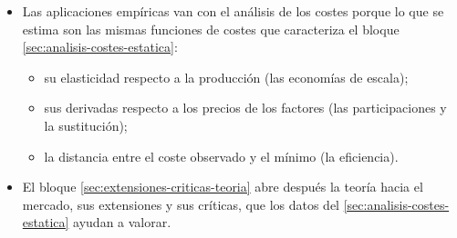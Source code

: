 \documentclass[11pt]{article}
\begin{document}
\begin{itemize}
\begin{itemize}
\begin{itemize}
\begin{itemize}
    \end{itemize}
  \item Las aplicaciones empíricas van con el análisis de los costes porque lo que se estima son las mismas funciones de costes que caracteriza el bloque \ref{sec:analisis-costes-estatica}:
    \begin{itemize}
    \item su elasticidad respecto a la producción (las economías de escala);
    \item sus derivadas respecto a los precios de los factores (las participaciones y la sustitución);
    \item la distancia entre el coste observado y el mínimo (la eficiencia).
    \end{itemize}
  \item El bloque \ref{sec:extensiones-criticas-teoria} abre después la teoría hacia el mercado, sus extensiones y sus críticas, que los datos del \ref{sec:analisis-costes-estatica} ayudan a valorar.
  \end{itemize}
  \end{itemize}
\end{itemize}
\end{document}
